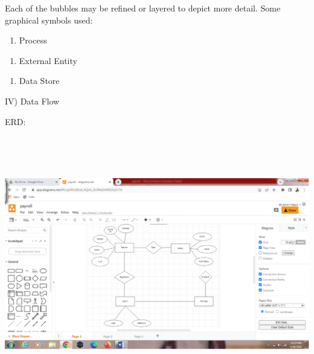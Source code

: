 \documentclass{article} %
\begin{document}
\noindent           Each of the bubbles may be refined or layered to depict more detail. Some graphical symbols used: 

\noindent 

\begin{enumerate}
\item  Process   
\end{enumerate}

\noindent                                           

\begin{enumerate}
\item  External Entity                            
\end{enumerate}

\noindent 

\noindent 

\begin{enumerate}
\item  Data Store                         
\end{enumerate}

\noindent 

\noindent       IV)     Data Flow 

\noindent 

\noindent ERD:

\noindent \includegraphics*[width=5.51in, height=4.41in, keepaspectratio=false, trim=3.21in 0.68in 3.52in 1.79in]{image5}

\noindent 

\noindent {}
\end{document}
